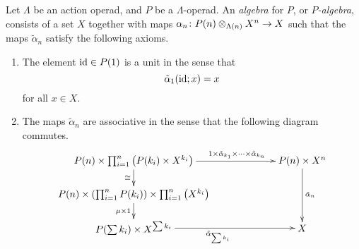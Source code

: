 \begin{Defi}[($P$-algebras)]\label{Defi:aop-alg}
Let $\Lambda$ be an action operad, and $P$ be a $\Lambda$-operad. An \textit{algebra} for $P$, or \emph{$P$-algebra}, consists of a set $X$ together with maps $\alpha_{n} \colon P(n) \otimes_{\Lambda(n)} X^{n} \rightarrow X$ such that the maps $\tilde{\alpha}_{n}$ satisfy the following axioms.
\begin{enumerate}
\item The element $\textrm{id} \in P(1)$ is a unit in the sense that
  \[
    \tilde{\alpha}_{1}(\textrm{id}; x) = x
  \]
for all $x \in X$.
\item The maps $\tilde{\alpha}_{n}$ are associative in the sense that the following diagram commutes.
  \[
    \xy
      (0,0)*+{P(n) \times \prod_{i=1}^n \left(P(k_i) \times X^{k_i}\right)}="ul";
      (60,0)*+{P(n) \times X^{n}}="ur";
      (0,-12)*+{P(n) \times \left(\prod_{i=1}^n P(k_i)\right) \times \prod_{i=1}^n \left(X^{k_i}\right) }="ml";
      (0,-24)*+{P(\sum k_{i}) \times X^{\sum k_{i}}}="bl";
      (60,-24)*+{X}="br";
      {\ar^>>>>>>>>>>>>>>{1 \times \tilde{\alpha}_{k_{1}} \times \cdots \times \tilde{\alpha}_{k_{n}}} "ul"; "ur"};
      {\ar^{\tilde{\alpha}_{n}} "ur"; "br"};
      {\ar_{\cong} "ul"; "ml"};
      {\ar_{\mu \times 1} "ml"; "bl"};
      {\ar_{\tilde{\alpha}_{\sum k_{i}}} "bl"; "br"};
    \endxy
  \]
\end{enumerate}
\end{Defi}

